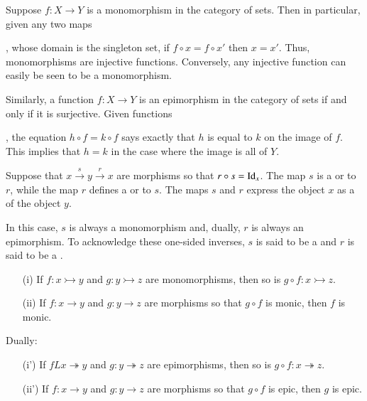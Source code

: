 \documentclass[12pt, a4paper, oneside, openright, titlepage]{book}
\begin{document}
\begin{eg}
    Suppose $f:X\rightarrow Y$ is a monomorphism in the category of sets. Then in particular, given any two maps , whose domain is the singleton set, if $f\circ x = f\circ x'$ then $x = x'$. Thus, monomorphisms are injective functions. Conversely, any injective function can easily be seen to be a monomorphism.


    Similarly, a function $f:X\rightarrow Y$ is an epimorphism in the category of sets if and only if it is surjective. Given functions , the equation $h\circ f = k\circ f$ says exactly that $h$ is equal to $k$ on the image of $f$. This implies that $h = k$ in the case where the image is all of $Y$.
\end{eg}

\begin{eg}
    Suppose that $x\xrightarrow{s}y\xrightarrow{r}x$ are morphisms so that $r\circ s = \operatorname{Id}_x$. The map $s$ is a  or  to $r$, while the map $r$ defines a  or  to $s$. The maps $s$ and $r$ express the object $x$ as a  of the object $y$.

    In this case, $s$ is always a monomorphism and, dually, $r$ is always an epimorphism. To acknowledge these one-sided inverses, $s$ is said to be a  and $r$ is said to be a .
\end{eg}

\begin{lem}
    \leavevmode
    \begin{enumerate}
        \item[(i)] If $f:x\rightarrowtail y$ and $g:y\rightarrowtail z$ are monomorphisms, then so is $g\circ f:x\rightarrowtail z$.
        \item[(ii)] If $f:x\rightarrow y$ and $g:y\rightarrow z$ are morphisms so that $g\circ f$ is monic, then $f$ is monic.
    \end{enumerate}
    Dually: \begin{enumerate}
        \item[(i')] If $fLx\twoheadrightarrow y$ and $g:y\twoheadrightarrow z$ are epimorphisms, then so is $g\circ f: x\twoheadrightarrow z$.
        \item[(ii')] If $f:x\rightarrow y$ and $g:y\rightarrow z$ are morphisms so that $g\circ f$ is epic, then $g$ is epic.
    \end{enumerate}
\end{lem}
\end{document}

